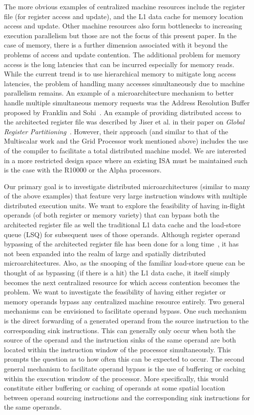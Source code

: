 The more obvious examples of centralized machine resources include
the register file (for register access and update),
and the L1 data cache for memory location access and update.
Other machine resources also form bottlenecks to increasing
execution parallelism but those are not the focus of this present
paper.
In the case of memory, there is a further dimension associated
with it beyond the problems of access and update contention.
The additional problem for memory access is the long latencies
that can be incurred especially for memory reads.
While the current trend is to use hierarchical memory to mitigate
long access latencies, the problem of
handling many accesses simultaneously due to machine parallelism remains.
An example of a microarchitecture mechanism to better handle
multiple simultaneous memory requests was the Address Resolution
Buffer proposed by Franklin and Sohi~\cite{franklin96arb}.
An example of providing distributed access to the architected
register file was described by Jiser et al. in their paper on
\textit{Global Register Partitioning}~\cite{Jiser00}.
However, their approach (and similar to that of the Multiscalar
work and the Grid Processor work mentioned above) includes
the use of the compiler to facilitate a total distributed 
machine model.
We are interested in a more restricted design space where an existing
ISA must be maintained such is the case with the R10000 or the Alpha
processors.

Our primary goal is to investigate distributed microarchitectures
(similar to many of the above examples) that feature very large
instruction windows with multiple distributed execution units.
We want to explore the feasibility of having in-flight operands
(of both register or memory variety) that can bypass both the
architected register file as well the traditional L1
data cache and the load-store queue (LSQ) for subsequent uses of
those operands.
Although register operand bypassing of the architected register 
file has been done for a long time~\cite{Tom67},
it has not been expanded into the realm of large and spatially distributed
microarchitectures.
Also, as the snooping of the familiar load-store queue can be
thought of as bypassing (if there is a hit) the L1 data cache, it
itself simply becomes the next centralized resource for which
access contention becomes the problem.
We want to investigate the feasibility of having 
either register or memory operands bypass any centralized
machine resource entirely.  
Two general mechanisms can be envisioned to facilitate
operand bypass.  
One such mechanism is the direct forwarding of a generated
operand from the source instruction to the corresponding sink
instructions.
This can generally only occur when
both the source of the operand and the instruction sinks of the same
operand are both located within the instruction window of the
processor simultaneously.  
This prompts the question as to how
often this can be expected to occur.
The second general mechanism to facilitate operand
bypass is the use of buffering or caching within the execution
window of the processor.
More specifically, this would constitute either buffering or caching of
operands at some spatial location between operand sourcing instructions
and the corresponding sink instructions for the same operands.

